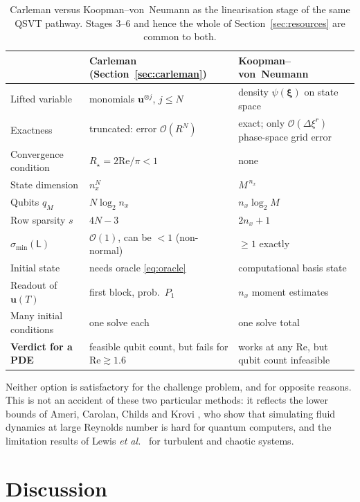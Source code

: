 \documentclass[11pt,a4paper]{article}
\theoremstyle{plain}
\theoremstyle{definition}
\theoremstyle{remark}
\newcommand{\Rey}{\mathrm{Re}}
\newcommand{\Oh}{\mathcal{O}}
\newcommand{\uvec}{\bm{u}}
\newcommand{\Lmat}{\mathsf{L}}
\begin{document}
\begin{table}[htbp]
\centering
\caption{Carleman versus Koopman--von~Neumann as the linearisation stage of the
same QSVT pathway.  Stages 3--6 and hence the whole of
Section~\ref{sec:resources} are common to both.}
\label{tab:kvn}
\footnotesize
\begin{tabular}{@{}l>{\raggedright\arraybackslash}p{5.6cm}>{\raggedright\arraybackslash}p{6.2cm}@{}}
\toprule
& Carleman (Section~\ref{sec:carleman}) & Koopman--von~Neumann\\
\midrule
Lifted variable & monomials $\uvec^{\otimes j}$, $j\le N$ & density $\psi(\bm\xi)$ on state space\\
Exactness & truncated: error $\Oh(R^{N})$ & exact; only $\Oh(\Delta\xi^{r})$ phase-space grid error\\
Convergence condition & $R_\star=2\Rey/\pi<1$ & none\\
State dimension & $n_x^{N}$ & $M^{\,n_x}$\\
Qubits $q_M$ & $N\log_2 n_x$ & $n_x\log_2 M$\\
Row sparsity $s$ & $4N-3$ & $2n_x+1$\\
$\sigma_{\min}(\Lmat)$ & $\Oh(1)$, can be $<1$ (non-normal) & $\ge1$ exactly\\
Initial state & needs oracle \eqref{eq:oracle} & computational basis state\\
Readout of $\uvec(T)$ & first block, prob.\ $P_1$ & $n_x$ moment estimates\\
Many initial conditions & one solve each & one solve total\\
\midrule
\textbf{Verdict for a PDE} & feasible qubit count, but fails for $\Rey\gtrsim1.6$
& works at any $\Rey$, but qubit count infeasible\\
\bottomrule
\end{tabular}
\end{table}

Neither option is satisfactory for the challenge problem, and for opposite
reasons.  This is not an accident of these two particular methods: it reflects
the lower bounds of Ameri, Carolan, Childs and Krovi \cite{Ameri2026}, who show
that simulating fluid dynamics at large Reynolds number is hard for quantum
computers, and the limitation results of Lewis \emph{et al.}\ \cite{Lewis2024}
for turbulent and chaotic systems.

\section{Discussion}
\label{sec:discussion}
\end{document}
